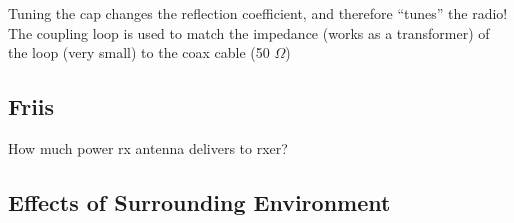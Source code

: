 Tuning the cap changes the reflection coefficient, and therefore ``tunes'' the
radio!
The coupling loop is used to match the impedance (works as a transformer) of the loop (very small) to
the coax cable (50 $\Omega$)

\subsection{Friis}

How much power rx antenna delivers to rxer?

\subsection{Effects of Surrounding Environment}



